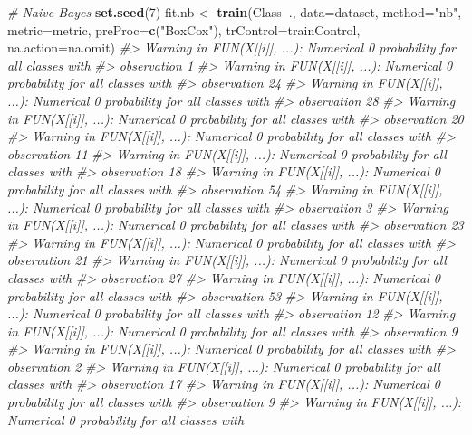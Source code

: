 \documentclass[]{book}
\newenvironment{Shaded}{\begin{snugshade}}{\end{snugshade}}
\newcommand{\CommentTok}[1]{\textcolor[rgb]{0.56,0.35,0.01}{\textit{#1}}}
\newcommand{\DataTypeTok}[1]{\textcolor[rgb]{0.13,0.29,0.53}{#1}}
\newcommand{\DecValTok}[1]{\textcolor[rgb]{0.00,0.00,0.81}{#1}}
\newcommand{\KeywordTok}[1]{\textcolor[rgb]{0.13,0.29,0.53}{\textbf{#1}}}
\newcommand{\NormalTok}[1]{#1}
\newcommand{\OperatorTok}[1]{\textcolor[rgb]{0.81,0.36,0.00}{\textbf{#1}}}
\newcommand{\StringTok}[1]{\textcolor[rgb]{0.31,0.60,0.02}{#1}}
\begin{document}
\begin{Shaded}
\begin{Highlighting}[]
\CommentTok{# Naive Bayes}
\KeywordTok{set.seed}\NormalTok{(}\DecValTok{7}\NormalTok{)}
\NormalTok{fit.nb <-}\StringTok{ }\KeywordTok{train}\NormalTok{(Class}\OperatorTok{~}\NormalTok{., }\DataTypeTok{data=}\NormalTok{dataset, }\DataTypeTok{method=}\StringTok{"nb"}\NormalTok{, }\DataTypeTok{metric=}\NormalTok{metric, }
                \DataTypeTok{preProc=}\KeywordTok{c}\NormalTok{(}\StringTok{"BoxCox"}\NormalTok{), }\DataTypeTok{trControl=}\NormalTok{trainControl, }\DataTypeTok{na.action=}\NormalTok{na.omit)}
\CommentTok{#> Warning in FUN(X[[i]], ...): Numerical 0 probability for all classes with}
\CommentTok{#> observation 1}
\CommentTok{#> Warning in FUN(X[[i]], ...): Numerical 0 probability for all classes with}
\CommentTok{#> observation 24}
\CommentTok{#> Warning in FUN(X[[i]], ...): Numerical 0 probability for all classes with}
\CommentTok{#> observation 28}
\CommentTok{#> Warning in FUN(X[[i]], ...): Numerical 0 probability for all classes with}
\CommentTok{#> observation 20}
\CommentTok{#> Warning in FUN(X[[i]], ...): Numerical 0 probability for all classes with}
\CommentTok{#> observation 11}
\CommentTok{#> Warning in FUN(X[[i]], ...): Numerical 0 probability for all classes with}
\CommentTok{#> observation 18}
\CommentTok{#> Warning in FUN(X[[i]], ...): Numerical 0 probability for all classes with}
\CommentTok{#> observation 54}
\CommentTok{#> Warning in FUN(X[[i]], ...): Numerical 0 probability for all classes with}
\CommentTok{#> observation 3}
\CommentTok{#> Warning in FUN(X[[i]], ...): Numerical 0 probability for all classes with}
\CommentTok{#> observation 23}
\CommentTok{#> Warning in FUN(X[[i]], ...): Numerical 0 probability for all classes with}
\CommentTok{#> observation 21}
\CommentTok{#> Warning in FUN(X[[i]], ...): Numerical 0 probability for all classes with}
\CommentTok{#> observation 27}
\CommentTok{#> Warning in FUN(X[[i]], ...): Numerical 0 probability for all classes with}
\CommentTok{#> observation 53}
\CommentTok{#> Warning in FUN(X[[i]], ...): Numerical 0 probability for all classes with}
\CommentTok{#> observation 12}
\CommentTok{#> Warning in FUN(X[[i]], ...): Numerical 0 probability for all classes with}
\CommentTok{#> observation 9}
\CommentTok{#> Warning in FUN(X[[i]], ...): Numerical 0 probability for all classes with}
\CommentTok{#> observation 2}
\CommentTok{#> Warning in FUN(X[[i]], ...): Numerical 0 probability for all classes with}
\CommentTok{#> observation 17}
\CommentTok{#> Warning in FUN(X[[i]], ...): Numerical 0 probability for all classes with}
\CommentTok{#> observation 9}
\CommentTok{#> Warning in FUN(X[[i]], ...): Numerical 0 probability for all classes with}

\end{Highlighting}
\end{Shaded}
\end{document}
